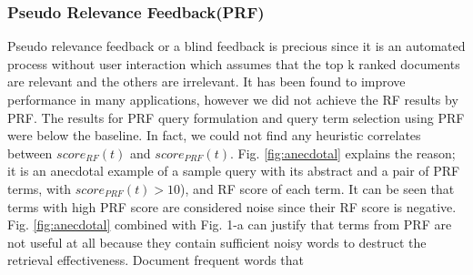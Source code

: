 \documentclass{sig-alternate}
\begin{document}
\subsubsection{Pseudo Relevance Feedback(PRF)}
Pseudo relevance feedback or a blind feedback is precious since it is an automated process without user interaction which assumes that the top k ranked documents are relevant and the others are irrelevant. It has been found to improve performance in many applications, however we did not achieve the RF results by PRF. The results for PRF query formulation and query term selection using PRF were below the baseline. In fact, we could not find any heuristic correlates between  $ score_{RF}(t)$ and $ score_{PRF}(t)$. Fig. \ref{fig:anecdotal} explains the reason; it is an anecdotal example of a sample query with its abstract and a pair of PRF terms, with $ score_{PRF}(t)>10 $), and RF score of each term. It can be seen that terms with high PRF score are considered noise since their RF score is negative. Fig. \ref{fig:anecdotal} combined with Fig. 1-a can justify that terms from PRF are not useful at all because they contain sufficient noisy words to destruct the retrieval effectiveness. Document frequent words that 
\end{document}
